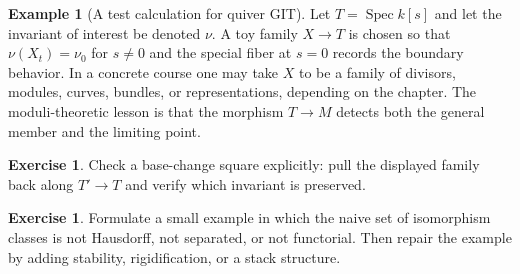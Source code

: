 \documentclass[11pt]{amsart}
\theoremstyle{definition}
\newtheorem{example}[theorem]{Example}
\newtheorem{exercise}[theorem]{Exercise}
\newcommand{\Spec}{\operatorname{Spec}}
\begin{document}
\begin{example}[A test calculation for quiver GIT]
Let $T=\Spec k[s]$ and let the invariant of interest be denoted $\nu$.  A toy family $X\to T$ is chosen so that $\nu(X_t)=\nu_0$ for $s\ne0$ and the special fiber at $s=0$ records the boundary behavior.  In a concrete course one may take $X$ to be a family of divisors, modules, curves, bundles, or representations, depending on the chapter.  The moduli-theoretic lesson is that the morphism $T\to M$ detects both the general member and the limiting point.
\end{example}
\begin{exercise}
Check a base-change square explicitly: pull the displayed family back along $T\prime\to T$ and verify which invariant is preserved.
\end{exercise}
\begin{exercise}
Formulate a small example in which the naive set of isomorphism classes is not Hausdorff, not separated, or not functorial.  Then repair the example by adding stability, rigidification, or a stack structure.
\end{exercise}
\clearpage
\end{document}
